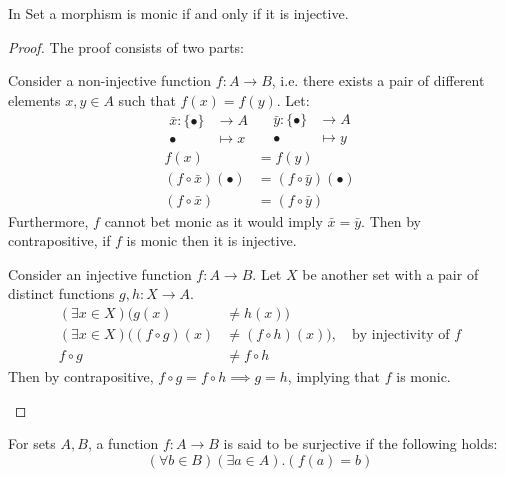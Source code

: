 \begin{theorem}\label{thm:mono_iff_inj}
  In Set a morphism is monic if and only if it is injective.

  \begin{proof}
    The proof consists of two parts:
    \begin{subproof}[$(\implies)$]
      Consider a non-injective function $f:A\to B$, i.e.
        there exists a pair of different elements $x,y\in A$ such that
        $f(x)=f(y)$. Let:
        \[
          \begin{aligned}
            \bar{x} : \{\bullet\} &\to A\\
            \bullet &\mapsto x
          \end{aligned}
          \quad
          \begin{aligned}
            \bar{y} : \{\bullet\} &\to A\\
            \bullet &\mapsto y
          \end{aligned}
        \]
        \[
          \begin{aligned}
            f(x) &= f(y)\\
            (f\circ\bar{x})(\bullet) &= (f\circ\bar{y})(\bullet)\\
            (f\circ\bar{x}) &= (f\circ\bar{y})
          \end{aligned}
        \]
        Furthermore, $f$ cannot bet monic as it would imply $\bar{x} = \bar{y}$.
        Then by contrapositive, if $f$ is monic then it is injective.
    \end{subproof}
    \begin{subproof}[$(\impliedby)$]
      Consider an injective function $f:A\to B$. Let $X$ be another set with a
      pair of distinct functions $g, h:X\to A$.
      \[
        \begin{aligned}
          (\exists x\in X)(g(x) &\neq h(x))\\
          (\exists x\in X)((f\circ g)(x) &\neq (f\circ h)(x))
          ,\quad\text{by injectivity of $f$}\\
          f\circ g &\neq f\circ h
        \end{aligned}
      \]
      Then by contrapositive, $f\circ g = f\circ h \implies g = h$, implying
      that $f$ is monic.
    \end{subproof}
  \end{proof}
\end{theorem}

\begin{definition}
  For sets $A,B$, a function $f:A\to B$ is said to be surjective if the
  following holds:
  \[(\forall b\in B)(\exists a\in A).(f(a)=b)\]
\end{definition}

